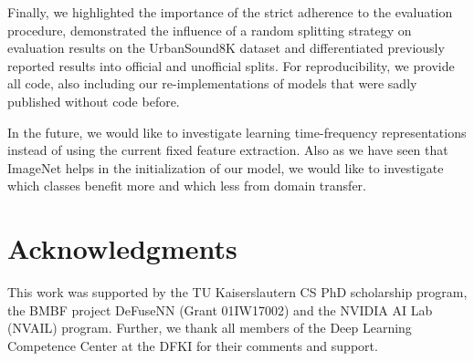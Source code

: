 \documentclass[a4paper,conference]{IEEEtran}
\begin{document}
Finally, we highlighted the importance of the strict adherence to the evaluation procedure, demonstrated the influence of a random splitting strategy on evaluation results on the \mbox{UrbanSound8K} dataset and differentiated previously reported results into official and unofficial splits.
For reproducibility, we provide all code, also including our re-implementations of models that were sadly published without code before.

In the future, we would like to investigate learning time-frequency representations instead of using the current fixed feature extraction.
Also as we have seen that ImageNet helps in the initialization of our model, we would like to investigate which classes benefit more and which less from domain transfer.


\section*{Acknowledgments}
This work was supported by the TU Kaiserslautern CS PhD scholarship program, the BMBF project DeFuseNN (Grant 01IW17002) and the NVIDIA AI Lab (NVAIL) program.
Further, we thank all members of the Deep Learning Competence Center at the DFKI for their comments and support. 




\end{document}
